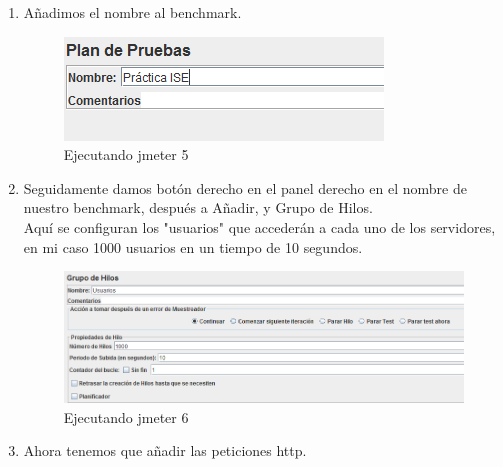 \begin{enumerate}
	\item Añadimos el nombre al benchmark.
	\begin{figure}[H] %
		\centering
		\includegraphics[scale=0.3]{pics/5}  %
		\caption{Ejecutando jmeter 5} \label{fig:jmt5}
	\end{figure}

	\item Seguidamente damos botón derecho en el panel derecho en el nombre de nuestro benchmark, después a Añadir, y Grupo de Hilos.\\
	Aquí se configuran los "usuarios" que accederán a cada uno de los servidores, en mi caso 1000 usuarios en un tiempo de 10 segundos.
	
	\begin{figure}[H] %
		\centering
		\includegraphics[scale=0.3]{pics/6}  %
		\caption{Ejecutando jmeter 6} \label{fig:jmt6}
	\end{figure}

\item Ahora tenemos que añadir las peticiones http.


\end{enumerate}
